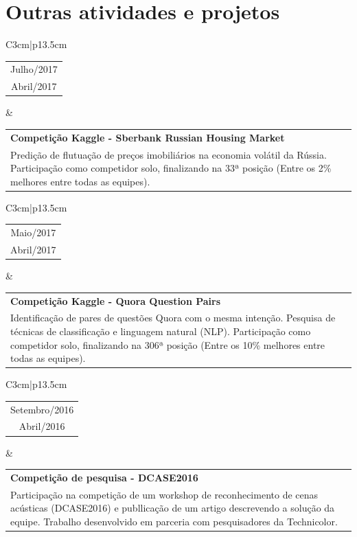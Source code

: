 \section{Outras atividades e projetos}

\begin{tabular}{C{3cm}|p{13.5cm}}
    \begin{tabular}{c}
        Julho/2017
        \\
        Abril/2017
    \end{tabular}
    &
    \setlength\extrarowheight{3pt}
    \begin{tabular}{p{13.5cm}}
        \textbf{Competição Kaggle - Sberbank Russian Housing Market}
        \\
        Predição de flutuação de preços imobiliários na economia volátil da Rússia. Participação como competidor solo, finalizando na 33ª posição (Entre os 2\% melhores entre todas as equipes).
    \end{tabular}
\end{tabular}


\begin{tabular}{C{3cm}|p{13.5cm}}
    \begin{tabular}{c}
        Maio/2017
        \\
        Abril/2017
    \end{tabular}
    &
    \setlength\extrarowheight{3pt}
    \begin{tabular}{p{13.5cm}}
        \textbf{Competição Kaggle - Quora Question Pairs}
        \\
        Identificação de pares de questões Quora com o mesma intenção. Pesquisa de técnicas de classificação e linguagem natural (NLP). Participação como competidor solo, finalizando na 306ª posição (Entre os 10\% melhores entre todas as equipes).
    \end{tabular}
\end{tabular}


\begin{tabular}{C{3cm}|p{13.5cm}}
    \begin{tabular}{c}
        Setembro/2016
        \\
        Abril/2016
    \end{tabular}
    &
    \setlength\extrarowheight{3pt}
    \begin{tabular}{p{13.5cm}}
        \textbf{Competição de pesquisa - DCASE2016}
        \\
        Participação na competição de um workshop de reconhecimento de cenas acústicas (DCASE2016) e publlicação de um artigo descrevendo a solução da equipe. Trabalho desenvolvido em parceria com pesquisadores da Technicolor.
    \end{tabular}
\end{tabular}



